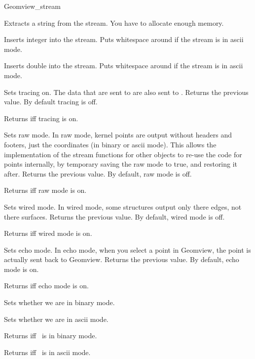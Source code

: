 \begin{ccClass}{Geomview_stream}
\begin{ccAdvanced}
{Extracts a string  from the stream.
\ccPrecond You have to allocate enough memory.}

{Inserts integer  into the stream. Puts whitespace around if the
stream is in ascii mode.}

{Inserts double  into the stream. Puts whitespace around if the
stream is in ascii mode.}

{Sets tracing on. The data that are sent to  are also
 sent to .  Returns the previous value. By default tracing is
 off.}

{Returns  iff tracing is on.}

{Sets raw mode.  In raw mode, kernel points are output without headers and
 footers, just the coordinates (in binary or ascii mode).  This allows the
 implementation of the stream functions for other objects to re-use the
 code for points internally, by temporary saving the raw mode to true, and
 restoring it after.
   Returns the previous value. By default, raw mode is off.}

{Returns  iff raw mode is on.}

{Sets wired mode.  In wired mode, some structures output only there edges,
 not there surfaces.
 Returns the previous value. By default, wired mode is off.}

{Returns  iff wired mode is on.}

{Sets echo mode.  In echo mode, when you select a point in Geomview, the point
 is actually sent back to Geomview.
 Returns the previous value. By default, echo mode is on.}

{Returns  iff echo mode is on.}

{Sets whether we are in binary mode.}

{Sets whether we are in ascii mode.}

{Returns  iff \ccVar\ is in binary mode.}

{Returns  iff \ccVar\ is in ascii mode.}


\end{ccAdvanced}
\end{ccClass}
